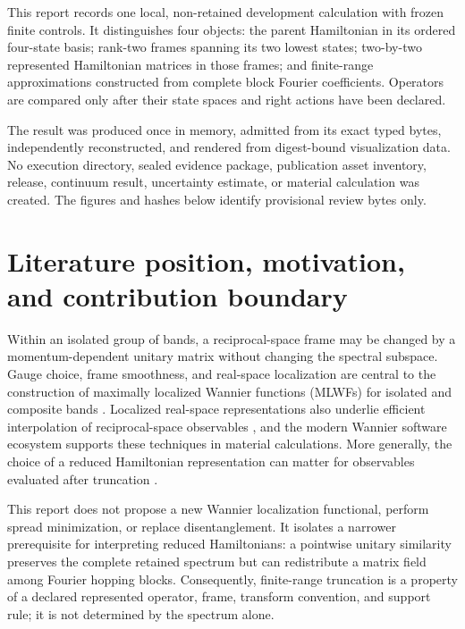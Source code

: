 \documentclass[11pt]{article}
\begin{document}
This report records one local, non-retained development calculation with frozen finite
controls.  It distinguishes four objects: the parent Hamiltonian in its ordered
four-state basis; rank-two frames spanning its two lowest states; two-by-two represented
Hamiltonian matrices in those frames; and finite-range approximations constructed from
complete block Fourier coefficients.  Operators are compared only after their state
spaces and right actions have been declared.

The result was produced once in memory, admitted from its exact typed bytes,
independently reconstructed, and rendered from digest-bound visualization data.  No
execution directory, sealed evidence package, publication asset inventory, release,
continuum result, uncertainty estimate, or material calculation was created.  The
figures and hashes below identify provisional review bytes only.

\section{Literature position, motivation, and contribution boundary}

Within an isolated group of bands, a reciprocal-space frame may be changed by a
momentum-dependent unitary matrix without changing the spectral subspace.  Gauge choice,
frame smoothness, and real-space localization are central to the construction of
maximally localized Wannier functions (MLWFs) for isolated and composite bands
\cite{marzari1997,souzaMarzariVanderbilt2001,marzariEtAl2012}.  Localized real-space
representations also underlie efficient interpolation of reciprocal-space observables
\cite{yates2007}, and the modern Wannier software ecosystem supports these techniques in
material calculations\cite{marrazzo2024}.  More generally, the choice of a reduced
Hamiltonian representation can matter for observables evaluated after truncation
\cite{ghosh2025}.

This report does not propose a new Wannier localization functional, perform spread
minimization, or replace disentanglement.  It isolates a narrower prerequisite for
interpreting reduced Hamiltonians: a pointwise unitary similarity preserves the complete
retained spectrum but can redistribute a matrix field among Fourier hopping blocks.
Consequently, finite-range truncation is a property of a declared represented operator,
frame, transform convention, and support rule; it is not determined by the spectrum
alone.
\end{document}
